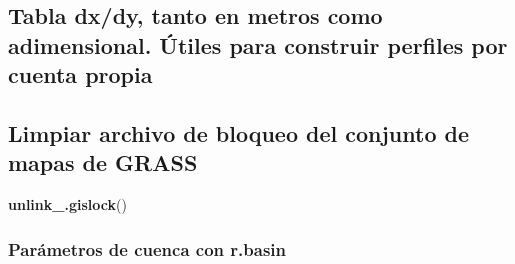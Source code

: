 \documentclass[11pt,]{article}
\newenvironment{Shaded}{\begin{snugshade}}{\end{snugshade}}
\newcommand{\KeywordTok}[1]{\textcolor[rgb]{0.13,0.29,0.53}{\textbf{#1}}}
\newcommand{\DecValTok}[1]{\textcolor[rgb]{0.00,0.00,0.81}{#1}}
\newcommand{\StringTok}[1]{\textcolor[rgb]{0.31,0.60,0.02}{#1}}
\newcommand{\OperatorTok}[1]{\textcolor[rgb]{0.81,0.36,0.00}{\textbf{#1}}}
\newcommand{\NormalTok}[1]{#1}
\begin{document}
\begin{Shaded}
\end{Shaded}

\subsection{Tabla dx/dy, tanto en metros como adimensional. Útiles para
construir perfiles por cuenta
propia}\label{tabla-dxdy-tanto-en-metros-como-adimensional.-uxfatiles-para-construir-perfiles-por-cuenta-propia}

\begin{Shaded}
\end{Shaded}

\subsection{Limpiar archivo de bloqueo del conjunto de mapas de
GRASS}\label{limpiar-archivo-de-bloqueo-del-conjunto-de-mapas-de-grass-2}

\begin{Shaded}
\begin{Highlighting}[]
\KeywordTok{unlink_.gislock}\NormalTok{()}
\end{Highlighting}
\end{Shaded}

\subsubsection{Parámetros de cuenca con
r.basin}\label{paruxe1metros-de-cuenca-con-r.basin}
\end{document}
